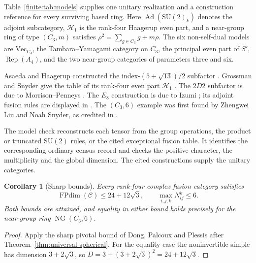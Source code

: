 \documentclass[11pt,a4paper]{article}
\newtheorem{corollary}[theorem]{Corollary}
\theoremstyle{definition}\newtheorem{definition}[theorem]{Definition}
\theoremstyle{remark}\newtheorem{remark}[theorem]{Remark}
\newcommand{\C}{\mathcal C}
\numberwithin{equation}{section}
\begin{document}
Table~\ref{finite:tab:models} supplies one unitary realization and a
construction reference for every surviving based ring. Here
$\operatorname{Ad}(\mathrm{SU}(2)_k)$ denotes the adjoint subcategory,
$\mathcal H_1$ is the rank-four Haagerup even part, and a near-group ring
of type $(C_3,m)$ satisfies
$\rho^2=\sum_{g\in C_3}g+m\rho$.
The six non-self-dual models are
$\mathrm{Vec}_{C_4}$, the Tambara--Yamagami category on $C_3$,
the principal even part of $S'$, $\operatorname{Rep}(A_4)$, and the
two near-group categories of parameters three and six.

Asaeda and Haagerup constructed the index-$(5+\sqrt{13})/2$ subfactor
\cite{AsaedaHaagerup}. Grossman and Snyder give the table of its rank-four
even part $\mathcal H_1$ \cite[Table~2]{GrossmanSnyder}. The $2D2$ subfactor is due to
Morrison--Penneys \cite[Theorem~1.1]{MorrisonPenneys}. The $E_8$
construction is due to Izumi \cite{IzumiE8}; its adjoint fusion
rules are displayed in \cite[Section~3.3]{EvansJones}. The
$(C_3,6)$ example was first found by Zhengwei Liu and Noah Snyder,
as credited in \cite[Section~10.6]{Izumi}.

The model check reconstructs each tensor from the group
operations, the product or truncated $\mathrm{SU}(2)$ rules, or the
cited exceptional fusion table. It identifies the corresponding ordinary
census record and checks the positive character, the multiplicity and
the global dimension. The cited constructions supply the unitary categories.
\begin{corollary}[Sharp bounds]\label{finite:cor:sharp-bounds}
Every rank-four complex fusion category satisfies
\[
\operatorname{FPdim}(\C)\leq24+12\sqrt3,
\qquad \max_{i,j,k}N_{ij}^k\leq6.
\]
Both bounds are attained, and equality in either bound holds precisely
for the near-group ring $\operatorname{NG}(C_3,6)$.
\end{corollary}
\begin{proof}
Apply the sharp pivotal bound of Dong, Palcoux and Plessis
\cite[Corollary~5.4]{DPP} after Theorem~\ref{thm:universal-spherical}.
For the equality case the noninvertible simple has dimension
$3+2\sqrt3$, so $D=3+(3+2\sqrt3)^2=24+12\sqrt3$.
\end{proof}
\end{document}
